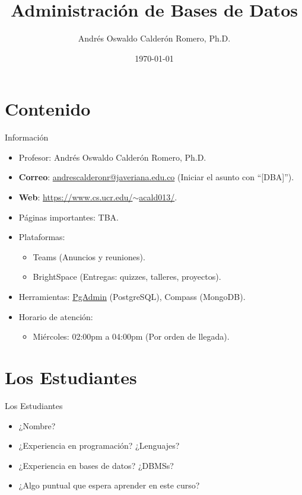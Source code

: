 \documentclass{beamer}
\title{Administración de Bases de Datos}
\author{Andrés Oswaldo Calderón Romero, Ph.D.}
\date{\today}
\begin{document}
\frame{\titlepage}

\section{Contenido}

\begin{frame}{Información}
\begin{itemize}
    \item Profesor: Andrés Oswaldo Calderón Romero, Ph.D.
    \item \textbf{Correo}: \href{mailto:andrescalderonr@javeriana.edu.co}{andrescalderonr@javeriana.edu.co} (Iniciar el asunto con ``[DBA]'').
    \item \textbf{Web}: \href{https://www.cs.ucr.edu/~acald013/}{https://www.cs.ucr.edu/$\sim$acald013/}.
    \item Páginas importantes: TBA.
    \item Plataformas: 
    \begin{itemize}
        \item Teams (Anuncios y reuniones).
        \item BrightSpace (Entregas: quizzes, talleres, proyectos).
    \end{itemize}
    \item Herramientas: \href{https://www.pgadmin.org/}{PgAdmin} (PostgreSQL), Compass (MongoDB).
    \item Horario de atención: 
    \begin{itemize}
        \item Miércoles: 02:00pm a 04:00pm (Por orden de llegada).
    \end{itemize}
\end{itemize}
\end{frame}

\section{Los Estudiantes}

\begin{frame}{Los Estudiantes}
\begin{itemize}
    \item ¿Nombre? 
    \item ¿Experiencia en programación? ¿Lenguajes? 
    \item ¿Experiencia en bases de datos? ¿DBMSs?
    \item ¿Algo puntual que espera aprender en este curso?
\end{itemize}
\end{frame}
\end{document}
